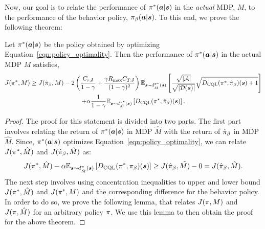 Now, our goal is to relate the performance of $\pi^*(\boldsymbol{a}|\boldsymbol{s})$ in the \emph{actual} MDP, $M$, to the performance of the behavior policy, ${\pi_\beta}(\boldsymbol{a}|\boldsymbol{s})$. To this end, we prove the following theorem:
\begin{theorem}
\label{thm:zeta_safe_app}
Let $\pi^*(\boldsymbol{a}|\boldsymbol{s})$ be the policy obtained by optimizing Equation~\ref{eqn:policy_optimality}. Then the performance of $\pi^*(\boldsymbol{a}|\boldsymbol{s})$ in the actual MDP $M$ satisfies,
\begin{multline}
    \label{eqn:performance_relation}
    J(\pi^*, M) \geq J(\hat{\pi}_\beta, M) - 2\left({\frac{C_{r, \delta}}{1 - \gamma} + \frac{\gamma R_{\max} C_{T, \delta}}{(1 - \gamma)^2}} \right)\mathbb{E}_{\boldsymbol{s} \sim d^{\pi^*}_{\hat{M}}(\boldsymbol{s})}\left[ \frac{\sqrt{|\mathcal{A}|}}{\sqrt{|\mathcal{D}(\boldsymbol{s})|}} \sqrt{ D_{\text{CQL}}(\pi^*, \hat{\pi}_\beta)(\boldsymbol{s}) + 1} \right] \\
    + \alpha \frac{1}{1 - \gamma} \mathbb{E}_{\boldsymbol{s} \sim d^{\pi^*}_{\hat{M}}(\boldsymbol{s})}\left[D_{\text{CQL}}(\pi^*, \hat{\pi}_\beta)(\boldsymbol{s}) \right].
\end{multline}
\end{theorem}
\begin{proof}
The proof for this statement is divided into two parts. The first part involves relating the return of $\pi^*(\boldsymbol{a}|\boldsymbol{s})$ in MDP $\hat{M}$ with the return of $\hat{\pi}_\beta$ in MDP $\hat{M}$. Since, $\pi^*(\boldsymbol{a}|\boldsymbol{s})$ optimizes Equation~\ref{eqn:policy_optimality}, we can relate $J(\pi^*, \hat{M})$ and $J(\hat{\pi}_\beta, \hat{M})$ as:
\begin{equation*}
    J(\pi^*, \hat{M}) - \alpha \mathbb{E}_{\boldsymbol{s} \sim d^\pi_{\hat{M}}(\boldsymbol{s})}\left[D_{\text{CQL}}(\pi^*, {\pi_\beta})(\boldsymbol{s}) \right] \geq J(\hat{\pi}_\beta, \hat{M)} - 0 = J(\hat{\pi}_\beta, \hat{M}).
\end{equation*}
The next step involves using concentration inequalities to upper and lower bound $J(\pi^*, \hat{M})$ and $J(\pi^*, M)$ and the corresponding difference for the behavior policy. In order to do so, we prove the following lemma, that relates $J(\pi, M)$ and $J(\pi, \hat{M})$ for an arbitrary policy $\pi$. We use this lemma to then obtain the proof for the above theorem.
\end{proof}

